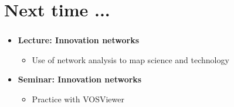 \documentclass[8pt]{beamer}
\begin{document}
\section*{Next time ...}

\bgroup
{}
\begin{frame}[plain]{}
\begin{center}
\color{white}{\Huge\insertsection}
\end{center}
\end{frame}
\egroup


\begin{frame}
\frametitle{\insertsection}

\begin{itemize}

\item 	\textbf{Lecture: Innovation networks}
	\begin{itemize}
	\item Use of network analysis to map science and technology
	\end{itemize}	
	

\medskip
\medskip

\item 	\textbf{Seminar: Innovation networks}
	\begin{itemize}
	\item Practice with VOSViewer
	\end{itemize}

		
\end{itemize}

\end{frame}

\end{document}
